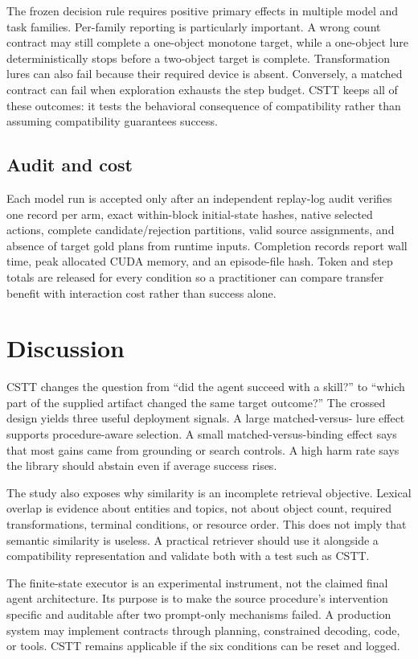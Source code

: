 \documentclass[pdflatex,sn-mathphys-num]{sn-jnl}
\begin{document}
The frozen decision rule requires positive primary effects in multiple model
and task families. Per-family reporting is particularly important. A wrong
count contract may still complete a one-object monotone target, while a
one-object lure deterministically stops before a two-object target is complete.
Transformation lures can also fail because their required device is absent.
Conversely, a matched contract can fail when exploration exhausts the step
budget. CSTT keeps all of these outcomes: it tests the behavioral consequence
of compatibility rather than assuming compatibility guarantees success.

\subsection{Audit and cost}
Each model run is accepted only after an independent replay-log audit verifies
one record per arm, exact within-block initial-state hashes, native selected
actions, complete candidate/rejection partitions, valid source assignments, and
absence of target gold plans from runtime inputs. Completion records report
wall time, peak allocated CUDA memory, and an episode-file hash. Token and step
totals are released for every condition so a practitioner can compare transfer
benefit with interaction cost rather than success alone.

\section{Discussion}
CSTT changes the question from ``did the agent succeed with a skill?'' to
``which part of the supplied artifact changed the same target outcome?'' The
crossed design yields three useful deployment signals. A large matched-versus-
lure effect supports procedure-aware selection. A small matched-versus-binding
effect says that most gains came from grounding or search controls. A high harm
rate says the library should abstain even if average success rises.

The study also exposes why similarity is an incomplete retrieval objective.
Lexical overlap is evidence about entities and topics, not about object count,
required transformations, terminal conditions, or resource order. This does
not imply that semantic similarity is useless. A practical retriever should use
it alongside a compatibility representation and validate both with a test such
as CSTT.

The finite-state executor is an experimental instrument, not the claimed final
agent architecture. Its purpose is to make the source procedure's intervention
specific and auditable after two prompt-only mechanisms failed. A production
system may implement contracts through planning, constrained decoding, code, or
tools. CSTT remains applicable if the six conditions can be reset and logged.
\end{document}
